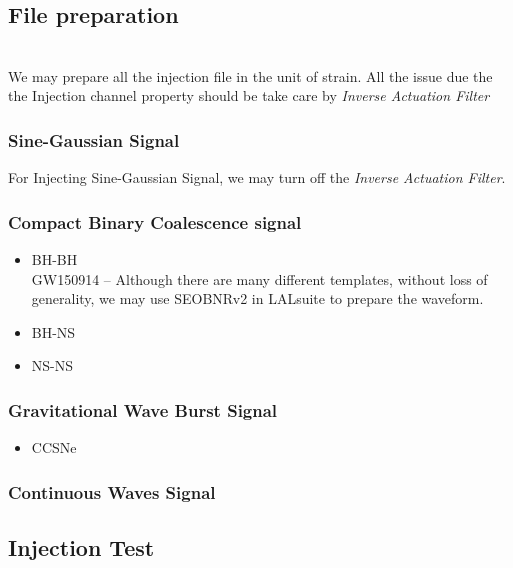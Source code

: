 \subsection{File preparation}
\\
We may prepare all the injection file in the unit of strain. All the issue due the the Injection channel property should be take care by \emph{Inverse Actuation Filter}
    \subsubsection{Sine-Gaussian Signal}
    For Injecting Sine-Gaussian Signal, we may turn off the \emph{Inverse Actuation Filter}.
    
    
    \subsubsection{Compact Binary Coalescence signal}
        \begin{itemize}
            \item BH-BH\\
            GW150914 -- Although there are many different templates, without loss of generality, we may use SEOBNRv2 in LALsuite to prepare the waveform.
            \item BH-NS
            \item NS-NS\\
        \end{itemize}
    \subsubsection{Gravitational Wave Burst Signal}
        \begin{itemize}
            \item CCSNe
        \end{itemize}
    \subsubsection{Continuous Waves Signal}

\subsection{Injection Test}
